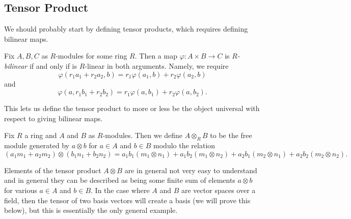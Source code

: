 \subsection{Tensor Product}
We should probably start by defining tensor products, which requires defining bilinear maps.
\begin{definition}[Bilinear]
	Fix $A,B,C$ as $R$-modules for some ring $R$. Then a map $\varphi:A\times B\to C$ is \textit{$R$-bilinear} if and only if is $R$-linear in both arguments. Namely, we require
	\[\varphi(r_1a_1+r_2a_2,b)=r_1\varphi(a_1,b)+r_2\varphi(a_2,b)\]
	and
	\[\varphi(a,r_1b_1+r_2b_2)=r_1\varphi(a,b_1)+r_2\varphi(a,b_2).\]
\end{definition}
This lets us define the tensor product to more or less be the object universal with respect to giving bilinear maps.
\begin{definition}
	Fix $R$ a ring and $A$ and $B$ as $R$-modules. Then we define $A\otimes_RB$ to be the free module generated by $a\otimes b$ for $a\in A$ and $b\in B$ modulo the relation
	\[(a_1m_1+a_2m_2)\otimes(b_1n_1+b_2n_2)=a_1b_1(m_1\otimes n_1)+a_1b_2(m_1\otimes n_2)+a_2b_1(m_2\otimes n_1)+a_2b_2(m_2\otimes n_2).\]
\end{definition}
Elements of the tensor product $A\otimes B$ are in general not very easy to understand and in general they can be described as being some finite sum of elements $a\otimes b$ for various $a\in A$ and $b\in B$. In the case where $A$ and $B$ are vector spaces over a field, then the tensor of two basis vectors will create a basis (we will prove this below), but this is essentially the only general example.

